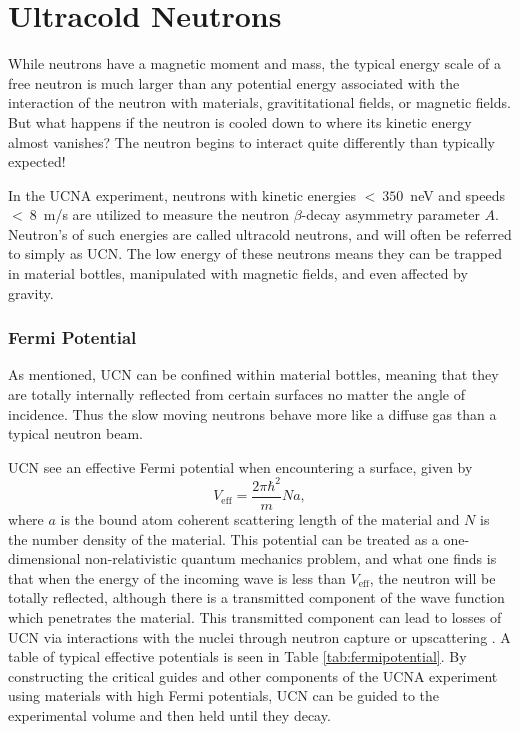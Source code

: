 \section{Ultracold Neutrons}

While neutrons have a magnetic moment and mass, the typical energy scale
of a free neutron is much larger than any potential energy associated with
the interaction of the neutron with materials, gravititational fields,
or magnetic fields. But what happens if the neutron is cooled down
to where its kinetic energy almost vanishes? The neutron begins to interact
quite differently than typically expected!

In the UCNA experiment, neutrons
with kinetic energies $<~350$~neV and speeds $<~8$~m/s are utilized to measure
the neutron $\beta$-decay asymmetry parameter $A$. Neutron's of such energies
are called ultracold neutrons, and will often be referred to simply as UCN. The
low energy of these neutrons means they can be trapped in material bottles, manipulated
with magnetic fields, and even affected by gravity.

\subsubsection{Fermi Potential} \label{sssec:fermipotential}

As mentioned, UCN can be confined within material bottles, meaning that they are
totally internally reflected from certain surfaces no matter the angle of incidence.
Thus the slow moving neutrons behave more like a diffuse gas than a typical neutron
beam.

UCN see an effective Fermi potential when encountering a surface, given by
%
\begin{equation}
  V_{\mathrm{eff}} = \frac{2\pi\hbar^2}{m}Na,
\end{equation}
where $a$ is the bound atom coherent scattering length of the material and $N$ is the number density of
the material. This potential can be treated as a one-dimensional non-relativistic quantum mechanics problem,
and what one finds is that when the energy of the incoming wave is less than $V_{\mathrm{eff}}$, the neutron will be
totally reflected, although there is a transmitted component of the wave function which penetrates the
material. This transmitted component can lead to losses of UCN via interactions with the nuclei through
neutron capture or upscattering \cite{golub1991ultra}. A table of typical effective potentials is seen
in Table \ref{tab:fermipotential}.
By constructing the critical guides and other components of the UCNA experiment using materials with high
Fermi potentials, UCN can be guided to the experimental volume and then held until they decay.


